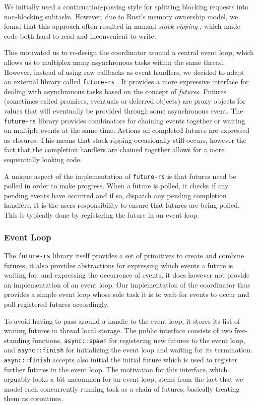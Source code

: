 We initially used a continuation-passing style for splitting blocking requests into
non-blocking subtasks. However, due to Rust's memory ownership model, we found that
this approach often resulted in manual \emph{stack ripping} \cite{stackmgmt},
which made code both hard to read and inconvenient to write.

This motivated us to re-design the coordinator around a central event loop, which
allows us to multiplex many asynchronous tasks within the same thread. However,
instead of using raw callbacks as event handlers, we decided to adapt an external
library called \lstinline{future-rs} \cite{futuresrs}. It provides a more expressive interface
for dealing with asynchronous tasks based on the concept of \emph{futures}. Futures
(sometimes called promises, eventuals or deferred objects) are proxy objects for
values that will eventually be provided through some asynchronous event.
The \lstinline{future-rs} library provides combinators for chaining events
together or waiting on multiple events at the same time. Actions on completed
futures are expressed as closures. This means that stack ripping occasionally still
occurs, however the fact that the completion handlers are chained together
allows for a more sequentially looking code.

A unique aspect of the implementation of \lstinline{future-rs} is that futures
need be polled in order to make progress. When a future is polled, it checks
if any pending events have occurred and if so, dispatch any pending completion
handlers. It is the users responsibility to ensure that futures are being
polled. This is typically done by registering the future in an event loop.

\subsubsection{Event Loop}
The \lstinline{future-rs} library itself provides a set of primitives to
create and combine futures, it also provides abstractions for expressing which
events a future is waiting for, and expressing the occurrence of events, it
does however not provide an implementation of an event loop. Our implementation
of the coordinator thus provides a simple event loop whose sole task it is
to wait for events to occur and poll registered futures accordingly.

To avoid having to pass around a handle to the event loop, it stores its 
list of waiting futures in thread local storage. The public interface consists 
of two free-standing functions, \lstinline{async::spawn} for registering
new futures to the event loop, and \lstinline{async::finish} for initializing
the event loop and waiting for its termination. \lstinline{async::finish} accepts
also initial the initial future which is used to register further futures in
the event loop. The motivation for this interface, which arguably looks
a bit uncommon for an event loop, stems from the fact that we model each
concurrently running task as a chain of futures, basically treating them as
coroutines.  

